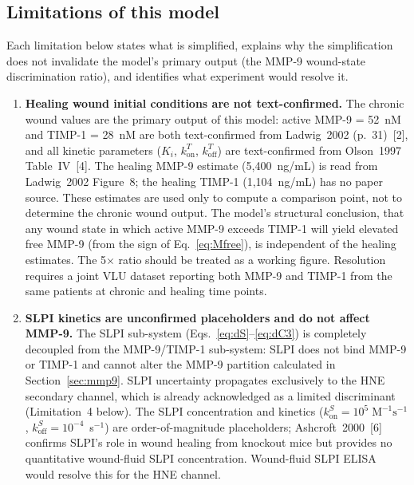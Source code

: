 \documentclass[10pt,a4paper]{article}
\numberwithin{equation}{section}
\newcommand{\kon}{k_{\text{on}}}
\newcommand{\koff}{k_{\text{off}}}
\newcommand{\Mms}{\text{M}^{-1}\text{s}^{-1}}
\newcommand{\cit}[1]{[#1]}   %
\begin{document}
\subsection{Limitations of this model}

Each limitation below states what is simplified, explains why the simplification does not
invalidate the model's primary output (the MMP-9 wound-state discrimination ratio), and
identifies what experiment would resolve it.

\begin{enumerate}[leftmargin=*]

  \item \textbf{Healing wound initial conditions are not text-confirmed.}
    The chronic wound values are the primary output of this model: active MMP-9 = 52~nM
    and TIMP-1 = 28~nM are both text-confirmed from Ladwig~2002 (p.~31)~\cit{2}, and
    all kinetic parameters ($K_i$, $\kon^T$, $\koff^T$) are text-confirmed from
    Olson~1997 Table~IV~\cit{4}. The healing MMP-9 estimate (5,400~ng/mL) is read from
    Ladwig~2002 Figure~8; the healing TIMP-1 (1,104~ng/mL) has no paper source.
    These estimates are used only to compute a comparison point, not to determine the
    chronic wound output. The model's structural conclusion, that any wound state in
    which active MMP-9 exceeds TIMP-1 will yield elevated free MMP-9 (from the sign
    of Eq.~\eqref{eq:Mfree}), is independent of the healing estimates. The 5$\times$
    ratio should be treated as a working figure. Resolution requires a joint VLU dataset
    reporting both MMP-9 and TIMP-1 from the same patients at chronic and healing
    time points.

  \item \textbf{SLPI kinetics are unconfirmed placeholders and do not affect MMP-9.}
    The SLPI sub-system (Eqs.~\ref{eq:dS}--\ref{eq:dC3}) is completely decoupled from
    the MMP-9/TIMP-1 sub-system: SLPI does not bind MMP-9 or TIMP-1 and cannot
    alter the MMP-9 partition calculated in Section~\ref{sec:mmp9}. SLPI uncertainty
    propagates exclusively to the HNE secondary channel, which is already acknowledged
    as a limited discriminant (Limitation~4 below). The SLPI concentration and kinetics
    ($\kon^S = 10^5\;\Mms$, $\koff^S = 10^{-4}$~s$^{-1}$) are order-of-magnitude
    placeholders; Ashcroft~2000~\cit{6} confirms SLPI's role in wound healing from
    knockout mice but provides no quantitative wound-fluid SLPI concentration.
    Wound-fluid SLPI ELISA would resolve this for the HNE channel.


\end{enumerate}
\end{document}
